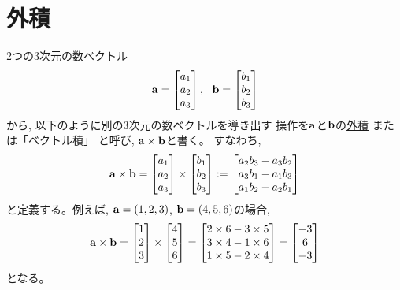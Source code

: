 \section{外積}
2つの3次元の数ベクトル
\begin{equation}
{\bf a}=
\begin{bmatrix}
a_1\\
a_2\\
a_3\\
\end{bmatrix},\,\,\,\,
{\bf b}=
\begin{bmatrix}b_1\\
b_2\\
b_3\\
\end{bmatrix}\label{eq:vectprod0}\end{equation}
から, 以下のように別の3次元の数ベクトルを導き出す
操作を${\bf a}$と${\bf b}$の\underline{外積} または「ベクトル積」
と呼び, ${\bf a}\times{\bf b}$と書く。
すなわち, 
\begin{eqnarray}
{\bf a}\times{\bf b}=
\begin{bmatrix}a_1\\
a_2\\
a_3\\
\end{bmatrix}\times
\begin{bmatrix}b_1\\
b_2\\
b_3\\
\end{bmatrix}:=
\begin{bmatrix}a_2b_3-a_3b_2\\
a_3b_1-a_1b_3\\
a_1b_2-a_2b_1\\
\end{bmatrix}\label{eq:vectprod}
\end{eqnarray}
と定義する。例えば, ${\bf a}=(1, 2, 3)$, ${\bf b}=(4, 5, 6)$の場合, 
\begin{eqnarray}
{\bf a}\times{\bf b}=
\begin{bmatrix}1\\
2\\
3\\
\end{bmatrix}\times
\begin{bmatrix}4\\
5\\
6\\
\end{bmatrix}=
\begin{bmatrix}2\times6-3\times5\\
3\times4-1\times6\\
1\times5-2\times4\\
\end{bmatrix}
=\begin{bmatrix}-3\\
6\\
-3\\
\end{bmatrix}\nonumber\\\label{eq:vectprod_ex1}
\end{eqnarray}
となる。\hv

